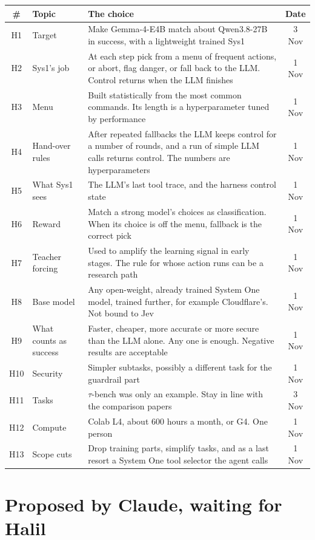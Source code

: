 \documentclass[10pt]{article}
\begin{document}
\begin{table}[H]
\footnotesize
\begin{tabularx}{\linewidth}{@{}c P{4cm} L c@{}}
\toprule
\# & Topic & The choice & Date \\
\midrule
H1 & Target & Make Gemma-4-E4B match about Qwen3.8-27B in success, with a lightweight trained Sys1 & 3 Nov \\
H2 & Sys1's job & At each step pick from a menu of frequent actions, or abort, flag danger, or fall back to the LLM. Control returns when the LLM finishes & 1 Nov \\
H3 & Menu & Built statistically from the most common commands. Its length is a hyperparameter tuned by performance & 1 Nov \\
H4 & Hand-over rules & After repeated fallbacks the LLM keeps control for a number of rounds, and a run of simple LLM calls returns control. The numbers are hyperparameters & 1 Nov \\
H5 & What Sys1 sees & The LLM's last tool trace, and the harness control state & 1 Nov \\
H6 & Reward & Match a strong model's choices as classification. When its choice is off the menu, fallback is the correct pick & 1 Nov \\
H7 & Teacher forcing & Used to amplify the learning signal in early stages. The rule for whose action runs can be a research path & 1 Nov \\
H8 & Base model & Any open-weight, already trained System One model, trained further, for example Cloudflare's. Not bound to Jev & 1 Nov \\
H9 & What counts as success & Faster, cheaper, more accurate or more secure than the LLM alone. Any one is enough. Negative results are acceptable & 1 Nov \\
H10 & Security & Simpler subtasks, possibly a different task for the guardrail part & 1 Nov \\
H11 & Tasks & $\tau$-bench was only an example. Stay in line with the comparison papers & 3 Nov \\
H12 & Compute & Colab L4, about 600 hours a month, or G4. One person & 1 Nov \\
H13 & Scope cuts & Drop training parts, simplify tasks, and as a last resort a System One tool selector the agent calls & 1 Nov \\
\bottomrule
\end{tabularx}
\end{table}

\section{Proposed by Claude, waiting for Halil}
\end{document}
